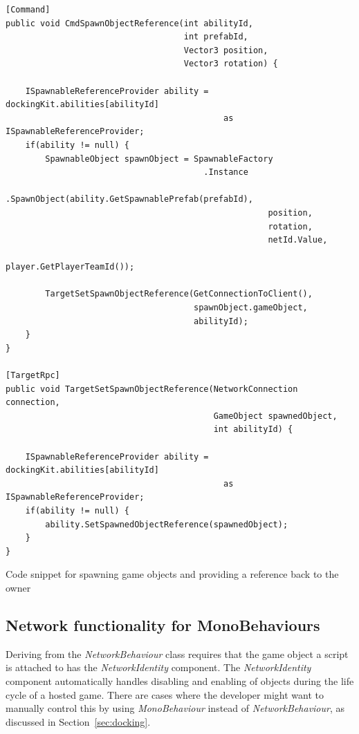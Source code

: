 \begin{listing}[htb]
\begin{verbatim}
[Command]
public void CmdSpawnObjectReference(int abilityId, 
                                    int prefabId, 
                                    Vector3 position, 
                                    Vector3 rotation) {
    
    ISpawnableReferenceProvider ability = dockingKit.abilities[abilityId] 
                                            as ISpawnableReferenceProvider;
    if(ability != null) {
        SpawnableObject spawnObject = SpawnableFactory
                                        .Instance
                                        .SpawnObject(ability.GetSpawnablePrefab(prefabId), 
                                                     position, 
                                                     rotation, 
                                                     netId.Value, 
                                                     player.GetPlayerTeamId());
        
        TargetSetSpawnObjectReference(GetConnectionToClient(), 
                                      spawnObject.gameObject, 
                                      abilityId);
    }
}

[TargetRpc]
public void TargetSetSpawnObjectReference(NetworkConnection connection, 
                                          GameObject spawnedObject, 
                                          int abilityId) {
    
    ISpawnableReferenceProvider ability = dockingKit.abilities[abilityId] 
                                            as ISpawnableReferenceProvider;
    if(ability != null) {
        ability.SetSpawnedObjectReference(spawnedObject);
    }
}
\end{verbatim}
\caption[Spawning game objects and passing the reference back to the owner]{Code snippet for spawning game objects and providing a reference back to the owner}
\label{listing:cmdSpawnedReference}
\end{listing}

\subsection{Network functionality for MonoBehaviours}
Deriving from the \emph{NetworkBehaviour} class requires that the game object a script is attached to has the \emph{NetworkIdentity} component. The \emph{NetworkIdentity} component automatically handles disabling and enabling of objects during the life cycle of a hosted game. There are cases where the developer might want to manually control this by using \emph{MonoBehaviour} instead of \emph{NetworkBehaviour}, as discussed in Section~\ref{sec:docking}. 

